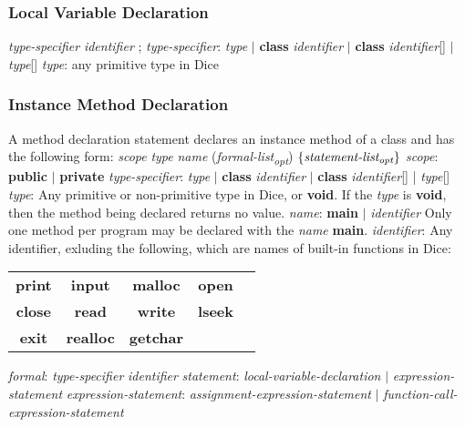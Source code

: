 \begin{homeworkProblem}
	\subsubsection{Local Variable Declaration}
	\textit{type-specifier} \textit{identifier} ;
	\newline
	\textit{type-specifier}: \textit{type} $|$ \textbf{class} \textit{identifier} $|$ \textbf{class} \textit{identifier}[] $|$ \textit{type}[]
	\newline
	\textit{type}: any primitive type in Dice
	
	\subsubsection{Instance Method Declaration}
	A method declaration statement declares an instance method of a class and has the following form:
	\newline
	\textit{scope} \textit{type} \textit{name} (\textit{formal-list\textsubscript{opt}}) $\left\{ \textit{statement-list\textsubscript{opt}} \right\}$
	\newline
	\textit{scope}: \textbf{public} $|$ \textbf{private}
	\newline
	\textit{type-specifier}: \textit{type} $|$ \textbf{class} \textit{identifier} $|$ \textbf{class} \textit{identifier}[] | \textit{type}[]
	\newline
	\textit{type}: Any primitive or non-primitive type in Dice, or \textbf{void}. If the \textit{type} is \textbf{void}, then the method being declared returns no value.
	\newline
	\textit{name}: \textbf{main} $|$ \textit{identifier}
	\newline
	Only one method per program may be declared with the \textit{name} \textbf{main}.
	\newline
	\textit{identifier}: Any identifier, exluding the following, which are names of built-in functions in Dice:
	\newline
	\begin{center}
		\begin{tabular}{ccccc}
			\textbf{print} & \textbf{input} & \textbf{malloc} & \textbf{open} \\
			\textbf{close} & \textbf{read} & \textbf{write} & \textbf{lseek} \\
			\textbf{exit} & \textbf{realloc} & \textbf{getchar}
		\end{tabular}
	\end{center}
	\textit{formal}: \textit{type-specifier} \textit{identifier}
	\newline
	\textit{statement}: \textit{local-variable-declaration} $|$ \textit{expression-statement}
	\newline
	\textit{expression-statement}: \textit{assignment-expression-statement} $|$ \textit{function-call-expression-statement}
	

\end{homeworkProblem}
